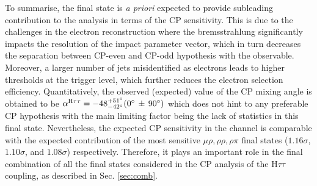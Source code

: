 To summarise, the \et final state is \textit{a priori} expected to provide subleading contribution to the analysis in terms of the CP sensitivity. This is due to the challenges in the electron reconstruction where the bremsstrahlung significantly impacts the resolution of the impact parameter vector, which in turn decreases the separation between CP-even and CP-odd hypothesis with the \phicp observable. Moreover, a larger number of jets misidentified as electrons leads to higher \pt thresholds at the trigger level, which further reduces the electron selection efficiency. Quantitatively, the observed (expected) value of the CP mixing angle is obtained to be $\alpha^{\text{H}\tau\tau} = -48^{+51^\circ}_{-42^\circ} (0^\circ \, \pm \, 90^\circ)$ which does not hint to any preferable CP hypothesis with the main limiting factor being the lack of statistics in this final state. Nevertheless, the expected CP sensitivity in the \et channel is comparable with the expected contribution of the most sensitive $\mu\rho, \rho\rho, \rho\pi$ final states ($1.16\sigma$, $1.10\sigma$, and $1.08\sigma$) respectively. Therefore, it plays an important role in the final combination of all the final states considered in the CP analysis of the $\text{H}\tau\tau$ coupling, as described in Sec. \ref{sec:comb}.